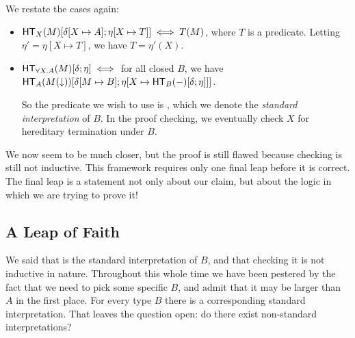 \documentclass{article}
\begin{document}
We restate the cases again:
\begin{itemize}
\item $\mathsf{HT}_{X}(M)[\delta[X\mapsto A];\eta[X\mapsto T]] \iff T(M)$, where $T$ is a predicate.
      Letting $\eta' = \eta[X \mapsto T]$, we have $T = \eta'(X)$.

\item $\mathsf{HT}_{\forall X. A}(M)[\delta;\eta] \iff $ for all closed $B$, we have
      $\mathsf{HT}_{A}(M(\downarrow))[\delta[M \mapsto B];\eta[X \mapsto \mathsf{HT}_{B}(-)[\delta;\eta]]]$.

      So the predicate we wish to use is , which we denote the
      \emph{standard interpretation} of $B$. In the proof checking, we eventually check $X$ for
      hereditary termination under $B$.
\end{itemize}

We now seem to be much closer, but the proof is still flawed because checking 
is still not inductive. This framework requires only one final leap before it is correct. The final
leap is a statement not only about our claim, but about the logic in which we are trying to prove it!

\subsection{A Leap of Faith}

We said that  is the standard interpretation of $B$, and that checking
it is not inductive in nature. Throughout this whole time we have been pestered by the fact that
we need to pick some specific $B$, and admit that it may be larger than $A$ in the first place.
For every type $B$ there is a corresponding standard interpretation.
That leaves the question open: do there exist non-standard interpretations?


\begin{center}
\end{center}
\end{document}

